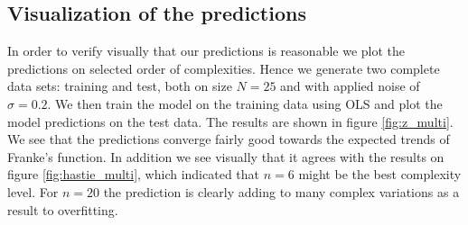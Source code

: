 \documentclass[norsk,a4paper,12pt]{scrartcl}
\begin{document}
\subsection{Visualization of the predictions}
In order to verify visually that our predictions is reasonable we plot the predictions on selected order of complexities. Hence we generate two complete data sets: training and test, both on size $N = 25$ and with applied noise of $\sigma = 0.2$. We then train the model on the training data using OLS and plot the model predictions on the test data. The results are shown in figure \ref{fig:z_multi}. We see that the predictions converge fairly good towards the expected trends of Franke's function. In addition we see visually that it agrees with the results on figure \ref{fig:hastie_multi}, which indicated that $n = 6$ might be the best complexity level. For $n = 20$ the prediction is clearly adding to many complex variations as a result to overfitting.
\end{document}
